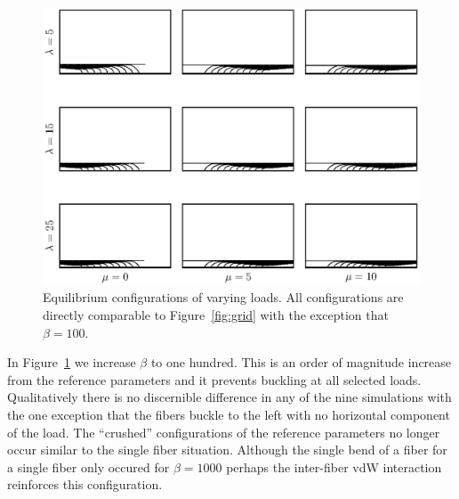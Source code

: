 	\begin{figure}
		\begin{center}
			\includegraphics[scale=1]{./fig/ch4/grid_b100.eps}
		\end{center}		
		\caption{Equilibrium configurations of varying loads. All configurations are directly comparable to Figure~\ref{fig:grid} with the exception that $\beta = 100$.
		\label{fig:grid_b100}}
	\end{figure}

	In Figure~\ref{fig:grid_b100} we increase $\beta$ to one hundred. This is an order of magnitude increase from the reference parameters and it prevents buckling at all selected loads. Qualitatively there is no discernible difference in any of the nine simulations with the one exception that the fibers buckle to the left with no horizontal component of the load. The ``crushed'' configurations of the reference parameters no longer occur similar to the single fiber situation. Although the single bend of a fiber for a single fiber only occured for $\beta=1000$ perhaps the inter-fiber vdW interaction reinforces this configuration.
	
